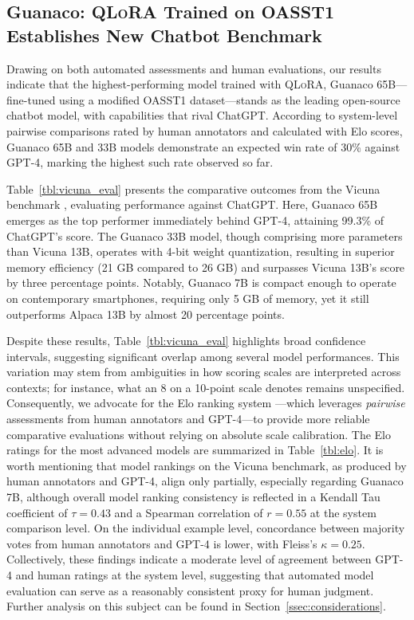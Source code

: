 \subsection{\textbf{Guanaco}: \textsc{QLoRA} Trained on OASST1 Establishes New Chatbot Benchmark} 

Drawing on both automated assessments and human evaluations, our results indicate that the highest-performing model trained with \textsc{QLoRA}, {Guanaco} 65B—fine-tuned using a modified OASST1 dataset—stands as the leading open-source chatbot model, with capabilities that rival ChatGPT. According to system-level pairwise comparisons rated by human annotators and calculated with Elo scores, {Guanaco} 65B and 33B models demonstrate an expected win rate of 30\% against GPT-4, marking the highest such rate observed so far.

Table~\ref{tbl:vicuna_eval} presents the comparative outcomes from the Vicuna benchmark \cite{vicuna2023}, evaluating performance against ChatGPT. Here, {Guanaco} 65B emerges as the top performer immediately behind GPT-4, attaining 99.3\% of ChatGPT’s score. The {Guanaco} 33B model, though comprising more parameters than Vicuna 13B, operates with 4-bit weight quantization, resulting in superior memory efficiency (21 GB compared to 26 GB) and surpasses Vicuna 13B’s score by three percentage points. Notably, {Guanaco} 7B is compact enough to operate on contemporary smartphones, requiring only 5 GB of memory, yet it still outperforms Alpaca 13B by almost 20 percentage points.

Despite these results, Table~\ref{tbl:vicuna_eval} highlights broad confidence intervals, suggesting significant overlap among several model performances. This variation may stem from ambiguities in how scoring scales are interpreted across contexts; for instance, what an 8 on a 10-point scale denotes remains unspecified. Consequently, we advocate for the Elo ranking system \citep{elo1967proposed}—which leverages \textit{pairwise} assessments from human annotators and GPT-4—to provide more reliable comparative evaluations without relying on absolute scale calibration. The Elo ratings for the most advanced models are summarized in Table~\ref{tbl:elo}. It is worth mentioning that model rankings on the Vicuna benchmark, as produced by human annotators and GPT-4, align only partially, especially regarding Guanaco 7B, although overall model ranking consistency is reflected in a Kendall Tau coefficient of $\tau=0.43$ and a Spearman correlation of $r=0.55$ at the system comparison level. On the individual example level, concordance between majority votes from human annotators and GPT-4 is lower, with Fleiss’s $\kappa=0.25$. Collectively, these findings indicate a moderate level of agreement between GPT-4 and human ratings at the system level, suggesting that automated model evaluation can serve as a reasonably consistent proxy for human judgment. Further analysis on this subject can be found in Section~\ref{ssec:considerations}.

